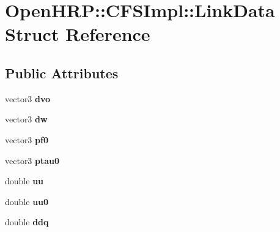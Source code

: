 \hypertarget{structOpenHRP_1_1CFSImpl_1_1LinkData}{\section{Open\-H\-R\-P\-:\-:C\-F\-S\-Impl\-:\-:Link\-Data Struct Reference}
\label{structOpenHRP_1_1CFSImpl_1_1LinkData}
}
\subsection*{Public Attributes}
\begin{DoxyCompactItemize}
\item 
\hypertarget{structOpenHRP_1_1CFSImpl_1_1LinkData_aa4cf5b0652d098ab4ea2be1ecf1e3248}{vector3 {\bfseries dvo}}\label{structOpenHRP_1_1CFSImpl_1_1LinkData_aa4cf5b0652d098ab4ea2be1ecf1e3248}

\item 
\hypertarget{structOpenHRP_1_1CFSImpl_1_1LinkData_a69b0d0a51edc38cb72792b61404df10b}{vector3 {\bfseries dw}}\label{structOpenHRP_1_1CFSImpl_1_1LinkData_a69b0d0a51edc38cb72792b61404df10b}

\item 
\hypertarget{structOpenHRP_1_1CFSImpl_1_1LinkData_a48cae13aceaa53e7a05a175028c8054d}{vector3 {\bfseries pf0}}\label{structOpenHRP_1_1CFSImpl_1_1LinkData_a48cae13aceaa53e7a05a175028c8054d}

\item 
\hypertarget{structOpenHRP_1_1CFSImpl_1_1LinkData_a7e2ff763392947e7e96c68ab137cfcf3}{vector3 {\bfseries ptau0}}\label{structOpenHRP_1_1CFSImpl_1_1LinkData_a7e2ff763392947e7e96c68ab137cfcf3}

\item 
\hypertarget{structOpenHRP_1_1CFSImpl_1_1LinkData_a3ee72839018e17c7aea5963c39c0b314}{double {\bfseries uu}}\label{structOpenHRP_1_1CFSImpl_1_1LinkData_a3ee72839018e17c7aea5963c39c0b314}

\item 
\hypertarget{structOpenHRP_1_1CFSImpl_1_1LinkData_afc5a9926fc54b6866a2554553d89a0c2}{double {\bfseries uu0}}\label{structOpenHRP_1_1CFSImpl_1_1LinkData_afc5a9926fc54b6866a2554553d89a0c2}

\item 
\hypertarget{structOpenHRP_1_1CFSImpl_1_1LinkData_a786f7c7990d5e5f85ac3602d754c058f}{double {\bfseries ddq}}\label{structOpenHRP_1_1CFSImpl_1_1LinkData_a786f7c7990d5e5f85ac3602d754c058f}


\end{DoxyCompactItemize}
